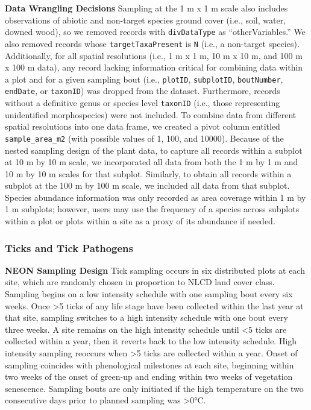 \documentclass[
  12pt,
]{article}
\begin{document}
\textbf{Data Wrangling Decisions} Sampling at the 1 m x 1 m scale also includes observations of abiotic and non-target species ground cover (i.e., soil, water, downed wood), so we removed records with \texttt{divDataType} as ``otherVariables.'' We also removed records whose \texttt{targetTaxaPresent} is \texttt{N} (i.e., a non-target species). Additionally, for all spatial resolutions (i.e., 1 m x 1 m, 10 m x 10 m, and 100 m x 100 m data), any record lacking information critical for combining data within a plot and for a given sampling bout (i.e., \texttt{plotID}, \texttt{subplotID}, \texttt{boutNumber}, \texttt{endDate}, or \texttt{taxonID}) was dropped from the dataset. Furthermore, records without a definitive genus or species level \texttt{taxonID} (i.e., those representing unidentified morphospecies) were not included. To combine data from different spatial resolutions into one data frame, we created a pivot column entitled \texttt{sample\_area\_m2} (with possible values of 1, 100, and 10000). Because of the nested sampling design of the plant data, to capture all records within a subplot at 10 m by 10 m scale, we incorporated all data from both the 1 m by 1 m and 10 m by 10 m scales for that subplot. Similarly, to obtain all records within a subplot at the 100 m by 100 m scale, we included all data from that subplot. Species abundance information was only recorded as area coverage within 1 m by 1 m subplots; however, users may use the frequency of a species across subplots within a plot or plots within a site as a proxy of its abundance if needed.

\hypertarget{ticks-and-tick-pathogens}{%
\subsubsection{Ticks and Tick Pathogens}\label{ticks-and-tick-pathogens}}

\textbf{NEON Sampling Design} Tick sampling occurs in six distributed plots at each site, which are randomly chosen in proportion to NLCD land cover class. Sampling begins on a low intensity schedule with one sampling bout every six weeks. Once \textgreater5 ticks of any life stage have been collected within the last year at that site, sampling switches to a high intensity schedule with one bout every three weeks. A site remains on the high intensity schedule until \textless5 ticks are collected within a year, then it reverts back to the low intensity schedule. High intensity sampling reoccurs when \textgreater5 ticks are collected within a year. Onset of sampling coincides with phenological milestones at each site, beginning within two weeks of the onset of green-up and ending within two weeks of vegetation senescence. Sampling bouts are only initiated if the high temperature on the two consecutive days prior to planned sampling was \textgreater0°C.
\end{document}
